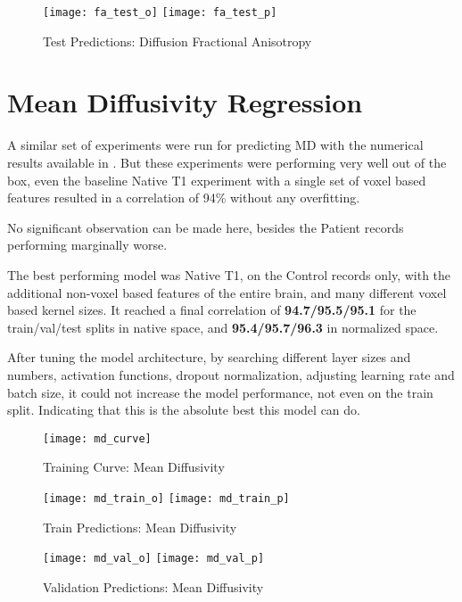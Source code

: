 \begin{figure}[H]
\centering
\texttt{[image: fa\_test\_o]}
\texttt{[image: fa\_test\_p]}
\caption{Test Predictions: Diffusion Fractional Anisotropy}
\label{fig:pred-tes-fa}
\end{figure}

\section{Mean Diffusivity Regression}

A similar set of experiments were run for predicting \ac{MD} with the numerical results available in  . But these experiments were performing very well out of the box, even the baseline Native T1 experiment with a single set of voxel based features resulted in a  correlation of 94\% without any overfitting.\par
No significant observation can be made here, besides the Patient records performing marginally worse.\par
The best performing model was Native T1, on the Control records only, with the additional non-voxel based features of the entire brain, and many different voxel based kernel sizes. It reached a final correlation of \textbf{94.7/95.5/95.1} for the train/val/test splits in native space, and \textbf{95.4/95.7/96.3} in normalized space.\par
After tuning the model architecture, by searching different layer sizes and numbers, activation functions, dropout normalization, adjusting learning rate and batch size, it could not increase the model performance, not even on the train split. Indicating that this is the absolute best this model can do.

\begin{figure}[H]
\centering
\texttt{[image: md\_curve]}
\caption{Training Curve: Mean Diffusivity}
\label{fig:curve-md}
\end{figure}

\begin{figure}[H]
\centering
\texttt{[image: md\_train\_o]}
\texttt{[image: md\_train\_p]}
\caption{Train Predictions: Mean Diffusivity}
\label{fig:pred-tra-md}
\end{figure}

\begin{figure}[H]
\centering
\texttt{[image: md\_val\_o]}
\texttt{[image: md\_val\_p]}
\caption{Validation Predictions: Mean Diffusivity}
\label{fig:pred-val-md}
\end{figure}

